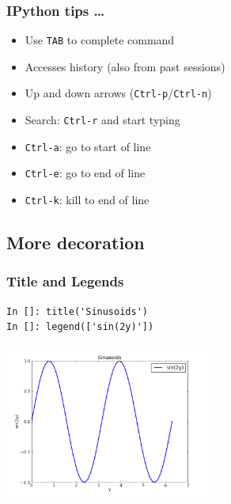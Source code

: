 \documentclass[14pt,compress]{beamer}
\newcommand{\typ}[1]{\lstinline{#1}}
\begin{document}
\begin{frame}[fragile]
\frametitle{IPython tips \ldots}

\begin{itemize}
    \item Use \typ{TAB} to complete command 
\end{itemize}
        \vspace*{0.5in}

        {\Large {}}
\begin{itemize}
    \item Accesses history (also from past sessions)

    \item Up and down arrows (\typ{Ctrl-p}/\typ{Ctrl-n})

    \item Search: \typ{Ctrl-r} and start typing

    \item \typ{Ctrl-a}: go to start of line

    \item \typ{Ctrl-e}: go to end of line

    \item \typ{Ctrl-k}: kill to end of line
\end{itemize}

\end{frame}


\subsection{More decoration}
\begin{frame}[fragile]
\frametitle{Title and Legends}
\vspace*{-0.15in}
\begin{lstlisting}
In []: title('Sinusoids')
In []: legend(['sin(2y)'])
\end{lstlisting}
  \vspace*{-0.1in}
  \begin{center}
  \includegraphics[height=2in, interpolate=true]{data/legend}  
  \end{center}
\end{frame}
\end{document}
